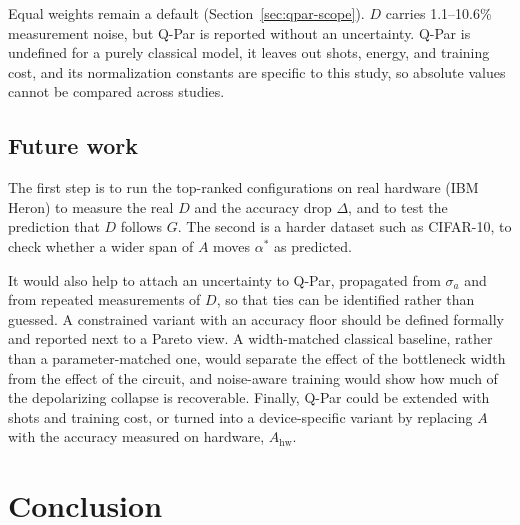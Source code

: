 \documentclass{ieeeaccess}
\begin{document}
Equal weights remain a default (Section~\ref{sec:qpar-scope}). $D$ carries 1.1--10.6\% measurement noise, but Q-Par is reported without an uncertainty. Q-Par is undefined for a purely classical model, it leaves out shots, energy, and training cost, and its normalization constants are specific to this study, so absolute values cannot be compared across studies.

\subsection{Future work}
\label{sec:future}

The first step is to run the top-ranked configurations on real hardware (IBM Heron) to measure the real $D$ and the accuracy drop $\Delta$, and to test the prediction that $D$ follows $G$. The second is a harder dataset such as CIFAR-10, to check whether a wider span of $A$ moves $\alpha^*$ as predicted.

It would also help to attach an uncertainty to Q-Par, propagated from $\sigma_a$ and from repeated measurements of $D$, so that ties can be identified rather than guessed. A constrained variant with an accuracy floor should be defined formally and reported next to a Pareto view. A width-matched classical baseline, rather than a parameter-matched one, would separate the effect of the bottleneck width from the effect of the circuit, and noise-aware training would show how much of the depolarizing collapse is recoverable. Finally, Q-Par could be extended with shots and training cost, or turned into a device-specific variant by replacing $A$ with the accuracy measured on hardware, $A_{\mathrm{hw}}$.

\section{Conclusion}
\label{sec:conclusion}
\end{document}

